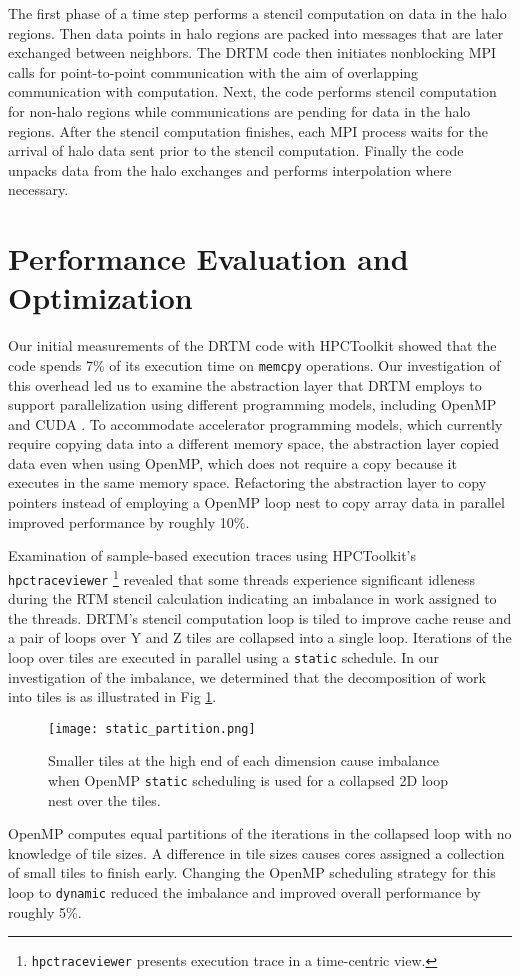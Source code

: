 \documentclass[conference]{IEEEtran}
\begin{document}
The first phase of a time step performs a stencil computation on data in the halo regions. Then data points in halo regions are packed into messages that are later exchanged between neighbors. The DRTM code then initiates nonblocking MPI calls for point-to-point communication with the aim of overlapping communication with computation. Next, the code performs stencil computation for non-halo regions while communications are pending for data in the halo regions. After the stencil computation finishes, each MPI process waits for the arrival of halo data sent prior to the stencil computation. Finally the code unpacks data from the halo exchanges and performs interpolation where necessary.

\section{Performance Evaluation and Optimization}

Our initial measurements of the DRTM code with HPCToolkit showed that the code spends 7\% of its execution time on \texttt{memcpy} operations. Our investigation of this overhead led us to examine the abstraction layer that DRTM employs to support parallelization using different programming models, including OpenMP and CUDA \cite{cuda}. To accommodate accelerator programming models, which currently require copying data into a different memory space, the abstraction layer copied data even when using OpenMP, which does not require a copy because it executes in the same memory space. Refactoring the abstraction layer to copy pointers instead of employing a OpenMP loop nest to copy array data in parallel improved performance by roughly 10\%.

Examination of sample-based execution traces using HPCToolkit's \texttt{hpctraceviewer} \footnote{\texttt{hpctraceviewer} presents execution trace in a time-centric view.} revealed that some threads experience significant idleness during the RTM stencil calculation indicating an imbalance in work assigned to the threads. DRTM's stencil computation loop is tiled to improve cache reuse and a pair of loops over Y and Z tiles are collapsed into a single loop. Iterations of the loop over tiles are executed in parallel using a \texttt{static} schedule. In our investigation of the imbalance, we determined that the decomposition of work into tiles is as illustrated in Fig \ref{fig:static_partition}. 
\begin{figure}[t]
    \centering
    \texttt{[image: static\_partition.png]}
    \caption{Smaller tiles at the high end of each dimension cause imbalance when OpenMP \texttt{static} scheduling is used for a collapsed 2D loop nest over the tiles.}
    \label{fig:static_partition}
\end{figure}
OpenMP computes equal partitions of the iterations in the collapsed loop with no knowledge of tile sizes. A difference in tile sizes causes cores assigned a collection of small tiles to finish early. Changing the OpenMP scheduling strategy for this loop to \texttt{dynamic} reduced the imbalance and improved overall performance by roughly 5\%.
\end{document}
